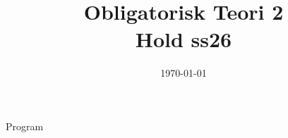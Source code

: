 \documentclass[11pt,aspectratio=169]{beamer}
\title{Obligatorisk Teori 2 \\ Hold ss26}
\date{\today}
\begin{document}
\begin{frame}
  \titlepage
\end{frame}

\begin{frame}{Program}
  \tableofcontents
\end{frame}


























\end{document}
